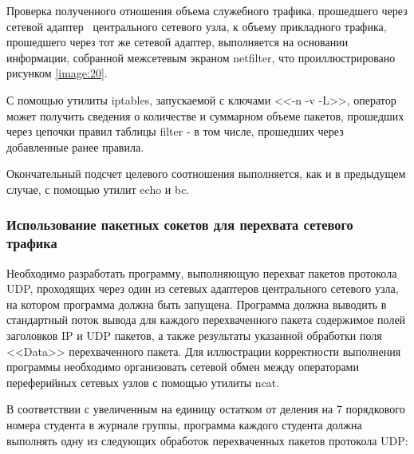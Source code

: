 
	Проверка полученного отношения объема служебного трафика, прошедшего через сетевой адаптер \midethf\ центрального
	сетевого узла, к объему прикладного трафика, прошедшего через тот же сетевой адаптер, выполняется на основании
	информации, собранной межсетевым экраном netfilter, что проиллюстрировано рисунком \ref{image:20}.

	С помощью утилиты iptables, запускаемой с ключами <<-n -v -L>>, оператор может получить сведения о количестве и
	суммарном объеме пакетов, прошедших через цепочки правил таблицы filter - в том числе, прошедших через добавленные
	ранее правила.

	Окончательный подсчет целевого соотношения выполняется, как и в предыдущем случае, с помощью утилит echo и bc.


\subsubsection{Использование пакетных сокетов для перехвата сетевого трафика}
\label{task:l4t4}

	Необходимо разработать программу, выполняющую перехват пакетов протокола UDP, проходящих через один из
	сетевых адаптеров центрального сетевого узла, на котором программа должна быть запущена.
	Программа должна выводить в стандартный поток вывода для каждого перехваченного пакета содержимое
	полей заголовков IP и UDP пакетов, а также результаты указанной обработки поля <<Data>> перехваченного пакета.
	Для иллюстрации корректности выполнения программы необходимо организовать сетевой обмен между операторами
	переферийных сетевых узлов с помощью утилиты ncat.

	В соответствии с увеличенным на единицу остатком от деления на 7 порядкового номера студента в журнале группы,
	программа каждого студента должна выполнять одну из следующих обработок перехваченных пакетов протокола
	UDP:

